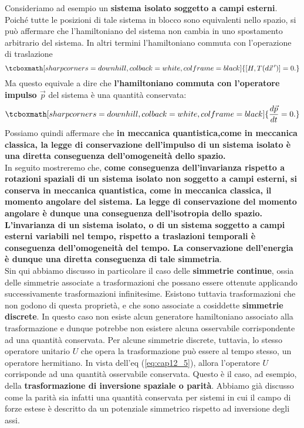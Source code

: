 \documentclass[a4paper,12pt,oneside]{book}
\begin{document}
Consideriamo ad esempio un \textbf{sistema isolato soggetto a campi esterni}. Poiché tutte le posizioni di tale sistema in blocco sono equivalenti nello spazio, si può affermare che l'hamiltoniano del sistema non cambia in uno spostamento arbitrario del sistema. In altri termini l'hamiltoniano commuta con l'operazione di traslazione
	\begin{equation}
		\tcboxmath[sharp corners=downhill, colback=white, colframe=black]{
			[H,T (d\vec{x}^{\, \prime})]=0.
			}
\end{equation}
Ma questo equivale a dire che \textbf{l'hamiltoniano commuta con l'operatore impulso $\vec{p}$} del sistema è una quantità conservata:
	\begin{equation}
		\tcboxmath[sharp corners=downhill, colback=white, colframe=black]{
			\frac{d\vec{p}}{dt}=0.
			}
	\end{equation}
Possiamo quindi affermare che \textbf{in meccanica quantistica,come in meccanica classica, la legge di conservazione dell'impulso di un sistema isolato è una diretta conseguenza dell'omogeneità dello spazio.}\\

In seguito mostreremo che, \textbf{come conseguenza dell'invarianza rispetto a rotazioni spaziali di un sistema isolato non soggetto a campi esterni, si conserva in meccanica quantistica, come in meccanica classica, il momento angolare del sistema. La legge di conservazione del momento angolare è dunque una conseguenza dell'isotropia dello spazio.}\\

\textbf{L'invarianza di un sistema isolato, o di un sistema soggetto a campi esterni variabili nel tempo, rispetto a traslazioni temporali è conseguenza dell'omogeneità del tempo. La conservazione dell'energia è dunque una diretta conseguenza di tale simmetria}.\\

Sin qui abbiamo discusso in particolare il caso delle \textbf{simmetrie continue}, ossia delle simmetrie associate a trasformazioni che possano essere ottenute applicando successivamente trasformazioni infinitesime.
Esistono tuttavia trasformazioni che non godono di questa proprietà, e che sono associate a cosiddette \textbf{simmetrie discrete}. In questo caso non esiste alcun generatore hamiltoniano associato alla trasformazione e dunque potrebbe non esistere alcuna osservabile corrispondente ad una quantità conservata. Per alcune simmetrie discrete, tuttavia, lo stesso operatore unitario $U$ che opera la trasformazione può essere al tempo stesso, un operatore hermitiano. In vista dell'eq (\ref{eq:cap12_5}), allora l'operatore $U$ corrisponde ad una quantità osservabile conservata. Questo è il caso, ad esempio, della \textbf{trasformazione di inversione spaziale o parità}. Abbiamo già discusso come la parità sia infatti una quantità conservata per sistemi in cui il campo di forze estese è descritto da un potenziale simmetrico rispetto ad inversione degli assi.
\end{document}
